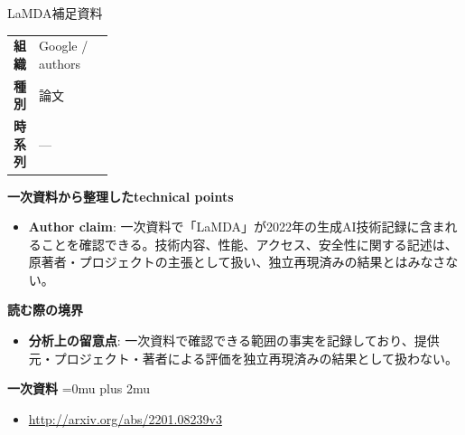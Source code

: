 \begin{technicalnote}{LaMDA}{補足資料}
\begingroup
\begin{tabularx}{\linewidth}{@{}>{\bfseries}p{0.22\linewidth}X@{}}
組織 & Google / authors \\
種別 & 論文 \\
時系列 & — \\
\end{tabularx}
\smallskip
{\bfseries 一次資料から整理したtechnical points}
\begin{itemize}[leftmargin=1.5em,itemsep=0.35em]
\item \textbf{Author claim}: 一次資料で「LaMDA」が2022年の生成AI技術記録に含まれることを確認できる。技術内容、性能、アクセス、安全性に関する記述は、原著者・プロジェクトの主張として扱い、独立再現済みの結果とはみなさない。
\end{itemize}
\begin{minipage}{\linewidth}
{\bfseries 読む際の境界}
\begin{itemize}[leftmargin=1.5em,itemsep=0.35em]
\item \textbf{分析上の留意点}: 一次資料で確認できる範囲の事実を記録しており、提供元・プロジェクト・著者による評価を独立再現済みの結果として扱わない。
\end{itemize}
\begin{samepage}
{\bfseries 一次資料}
\begingroup\sloppy
\Urlmuskip=0mu plus 2mu\relax
\begin{itemize}[leftmargin=1.5em,itemsep=0.25em]
\item {\scriptsize\url{http://arxiv.org/abs/2201.08239v3}}
\end{itemize}
\endgroup
\end{samepage}
\end{minipage}
\endgroup
\end{technicalnote}
\medskip

